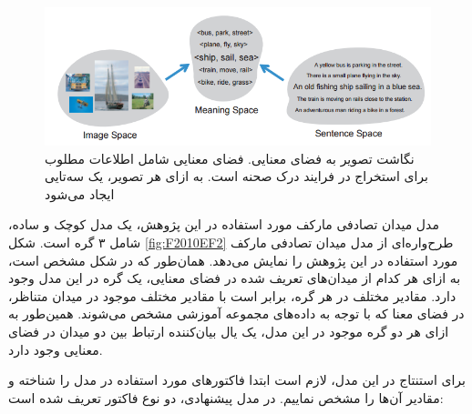 \begin{figure}[h]
\center
\includegraphics[scale=0.7]{./Imgs/farhadi2010every_fig1.png}
\caption{
نگاشت تصویر به فضای معنایی. فضای معنایی شامل اطلاعات مطلوب برای استخراج در فرایند درک صحنه است. به ازای هر تصویر، یک سه‌تایی ایجاد می‌شود\cite{Farhadi2010every.}
}
\label{fig:F2010EF1}
\end{figure}

مدل میدان تصادفی مارکف مورد استفاده در این پژوهش، یک مدل کوچک و ساده، شامل ۳ گره است. شکل \ref{fig:F2010EF2}
طرح‌واره‌ای از مدل میدان تصادفی مارکف مورد استفاده در این پژوهش را نمایش می‌دهد. همان‌طور که در شکل مشخص است،  به ازای هر کدام از میدان‌های تعریف شده در فضای معنایی، یک گره در این مدل وجود دارد. مقادیر مختلف در هر گره، برابر است با مقادیر مختلف موجود در میدان متناظر، در فضای معنا که با توجه به داده‌های مجموعه‌‌ ‌آموزشی مشخص می‌شوند. همین‌طور به ازای هر دو گره موجود در این مدل، یک یال بیان‌کننده ارتباط بین دو میدان در فضای معنایی وجود دارد.

برای استنتاج در این مدل، لازم است ابتدا فاکتور‌های مورد استفاده در مدل را شناخته و مقادیر آن‌ها را مشخص نماییم. در مدل پیشنهادی، دو نوع فاکتور تعریف شده است:

